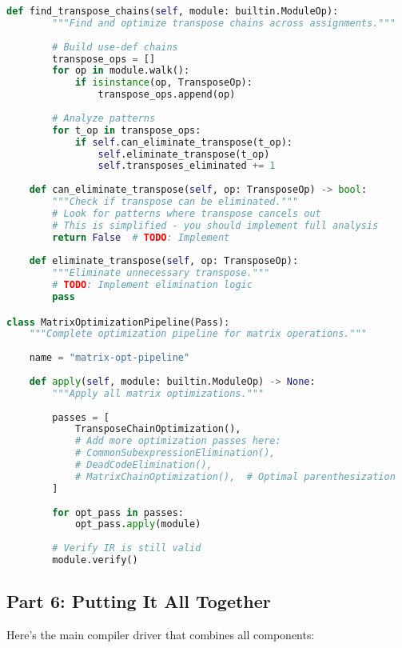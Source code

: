 \documentclass[11pt,a4paper]{article}
\begin{document}
\begin{lstlisting}[language=Python, caption=src/middle-end.py - Double Transpose Elimination]
    def find_transpose_chains(self, module: builtin.ModuleOp):
        """Find and optimize transpose chains across assignments."""
        
        # Build use-def chains
        transpose_ops = []
        for op in module.walk():
            if isinstance(op, TransposeOp):
                transpose_ops.append(op)
        
        # Analyze patterns
        for t_op in transpose_ops:
            if self.can_eliminate_transpose(t_op):
                self.eliminate_transpose(t_op)
                self.transposes_eliminated += 1
    
    def can_eliminate_transpose(self, op: TransposeOp) -> bool:
        """Check if transpose can be eliminated."""
        # Look for patterns where transpose cancels out
        # This is simplified - you should implement full analysis
        return False  # TODO: Implement
    
    def eliminate_transpose(self, op: TransposeOp):
        """Eliminate unnecessary transpose."""
        # TODO: Implement elimination logic
        pass

class MatrixOptimizationPipeline(Pass):
    """Complete optimization pipeline for matrix operations."""
    
    name = "matrix-opt-pipeline"
    
    def apply(self, module: builtin.ModuleOp) -> None:
        """Apply all matrix optimizations."""
        
        passes = [
            TransposeChainOptimization(),
            # Add more optimization passes here:
            # CommonSubexpressionElimination(),
            # DeadCodeElimination(),
            # MatrixChainOptimization(),  # Optimal parenthesization
        ]
        
        for opt_pass in passes:
            opt_pass.apply(module)
        
        # Verify IR is still valid
        module.verify()
\end{lstlisting}

\subsection{Part 6: Putting It All Together}

Here's the main compiler driver that combines all components:
\end{document}
